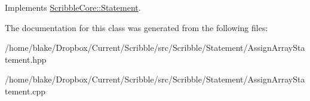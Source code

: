 Implements \hyperlink{class_scribble_core_1_1_statement}{Scribble\-Core\-::\-Statement}.



The documentation for this class was generated from the following files\-:\begin{DoxyCompactItemize}
\item 
/home/blake/\-Dropbox/\-Current/\-Scribble/src/\-Scribble/\-Statement/Assign\-Array\-Statement.\-hpp\item 
/home/blake/\-Dropbox/\-Current/\-Scribble/src/\-Scribble/\-Statement/Assign\-Array\-Statement.\-cpp\end{DoxyCompactItemize}
